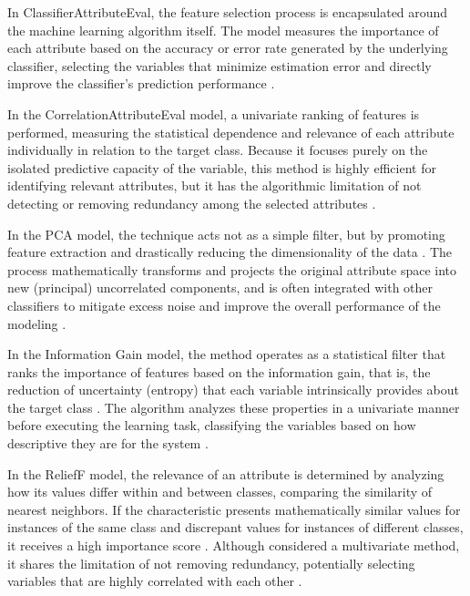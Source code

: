 \documentclass{ieeeaccess}
\begin{document}
In ClassifierAttributeEval, the feature selection process is encapsulated around the machine learning algorithm itself. The model measures the importance of each attribute based on the accuracy or error rate generated by the underlying classifier, selecting the variables that minimize estimation error and directly improve the classifier's prediction performance \cite{ali2023analysis}.

In the CorrelationAttributeEval model, a univariate ranking of features is performed, measuring the statistical dependence and relevance of each attribute individually in relation to the target class. Because it focuses purely on the isolated predictive capacity of the variable, this method is highly efficient for identifying relevant attributes, but it has the algorithmic limitation of not detecting or removing redundancy among the selected attributes \cite{ali2023analysis}.

In the PCA model, the technique acts not as a simple filter, but by promoting feature extraction and drastically reducing the dimensionality of the data \cite{ali2023analysis} \cite{kalabarige2023boosting}. The process mathematically transforms and projects the original attribute space into new (principal) uncorrelated components, and is often integrated with other classifiers to mitigate excess noise and improve the overall performance of the modeling \cite{ali2023analysis} \cite{kalabarige2023boosting}.

In the Information Gain model, the method operates as a statistical filter that ranks the importance of features based on the information gain, that is, the reduction of uncertainty (entropy) that each variable intrinsically provides about the target class \cite{ali2023analysis}. The algorithm analyzes these properties in a univariate manner before executing the learning task, classifying the variables based on how descriptive they are for the system \cite{jimenez2022multivariate}.

In the ReliefF model, the relevance of an attribute is determined by analyzing how its values differ within and between classes, comparing the similarity of nearest neighbors. If the characteristic presents mathematically similar values for instances of the same class and discrepant values for instances of different classes, it receives a high importance score \cite{ali2023analysis}. Although considered a multivariate method, it shares the limitation of not removing redundancy, potentially selecting variables that are highly correlated with each other \cite{jimenez2022multivariate}.
\end{document}
